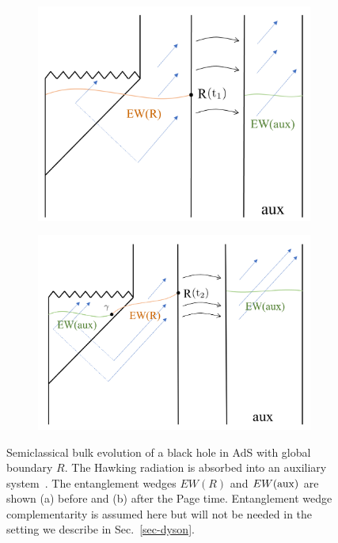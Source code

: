 \documentclass[12pt,letterpaper]{article}
\begin{document}
\begin{figure}
\centering
\begin{subfigure}{.5\textwidth}
  \centering
  \includegraphics[width=.8\linewidth]{r1f}
  \caption{ }
  \label{fig:sub11}
\end{subfigure}%
\begin{subfigure}{.5\textwidth}
  \centering
  \includegraphics[width=.9\linewidth]{r2ff}
  \caption{ }
  \label{fig:sub22}
\end{subfigure}
\caption{Semiclassical bulk evolution of a black hole in AdS with global boundary $R$. The Hawking radiation is absorbed into an auxiliary system~\cite{Pen19,AEMM}. The entanglement wedges $EW(R)$ and $EW({\rm aux})$ are shown (a) before and (b) after the Page time. Entanglement wedge complementarity is assumed here but will not be needed in the setting we describe in Sec.~\ref{sec-dyson}.}
\label{fig-qes}
\end{figure}
\end{document}
